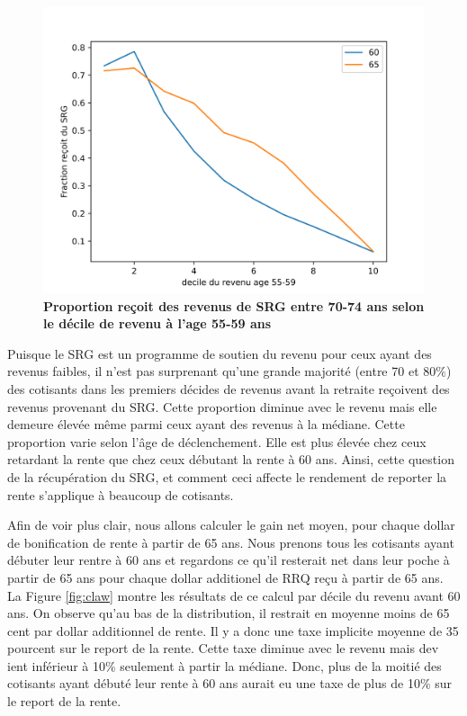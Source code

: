 \documentclass[french, 12pt]{article}
\begin{document}
	\begin{figure}[!htbp]
	\centering 
	\includegraphics[scale=0.75]{../figures/srg_decile.png}
	\caption{\textbf{Proportion reçoit des revenus de SRG entre 70-74 ans selon le décile de revenu à l'age 55-59 ans}}
	\label{fig:gis}
	\end{figure}		
	
	Puisque le SRG est un programme de soutien du revenu pour ceux ayant des revenus faibles, il n'est pas surprenant qu'une grande majorité (entre 70 et 80\%) des cotisants dans les premiers décides de revenus avant la retraite reçoivent des revenus provenant du SRG. Cette proportion diminue avec le revenu mais elle demeure élevée même parmi ceux ayant des revenus à la médiane. Cette proportion varie selon l'âge de déclenchement. Elle est plus élevée chez ceux retardant la rente que chez ceux débutant la rente à 60 ans. Ainsi, cette question de la récupération du SRG, et comment ceci affecte le rendement de reporter la rente s'applique à beaucoup de cotisants. 
	
	Afin de voir plus clair, nous allons calculer le gain net moyen, pour chaque dollar de bonification de rente à partir de 65 ans. Nous prenons tous les cotisants ayant débuter leur rentre à 60 ans et regardons ce qu'il resterait net dans leur poche à partir de 65 ans pour chaque dollar additionel de RRQ reçu à partir de 65 ans. La Figure \ref{fig:claw} montre les résultats de ce calcul par décile du revenu avant 60 ans. On observe qu'au bas de la distribution, il restrait en moyenne moins de 65 cent par dollar additionnel de rente. Il y a donc une taxe implicite moyenne de 35 pourcent sur le report de la rente. Cette taxe diminue avec le revenu mais dev ient inférieur à 10\% seulement à partir la médiane. Donc, plus de la moitié des cotisants ayant débuté leur rente à 60 ans aurait eu une taxe de plus de 10\% sur le report de la rente.   
	
\end{document}
